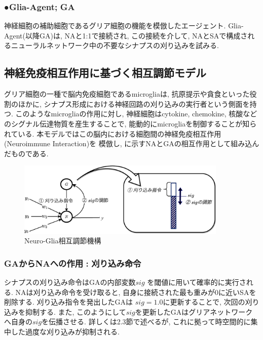 \documentclass[a4paper, 10.5pt,twocolumn,dvipdfmx]{jsarticle}
\begin{document}
  \subsubsection*{●Glia-Agent;\,\,GA}
  神経細胞の補助細胞であるグリア細胞の機能を模倣したエージェント. 
  Glia-Agent(以降GA)は, NAと1:1で接続され, この接続を介して, 
  NAとSAで構成されるニューラルネットワーク中の不要なシナプスの刈り込みを試みる.
  \vspace{2mm}
\subsection{神経免疫相互作用に基づく相互調節モデル}
グリア細胞の一種で脳内免疫細胞であるmicrogliaは, 抗原提示や貪食といった役割のほかに,  
シナプス形成における神経回路の刈り込みの実行者という側面を持つ. 
このようなmicrogliaの作用に対し, 
神経細胞はcytokine, chemokine, 核酸などのシグナル伝達物質を産生することで, 
能動的にmicrogliaを制御することが知られている. 
本モデルではこの脳内における細胞間の神経免疫相互作用(Neuroimmune Interaction)を
模倣し,
に示すNAとGAの相互作用として組み込んだものである.
\vspace{-1.5zh}
\begin{figure}[H]
  \centering
  \includegraphics[width=10cm]{NewDeal-crop.pdf}
  \caption{Neuro-Glia相互調節機構}
  \label{fig:NeuroGlia}
\end{figure}
\vspace{-2zh}
\vspace{2mm}
\subsubsection{GAからNAへの作用\,\,:\,\,刈り込み命令}
シナプスの刈り込み命令はGAの内部変数$sig$
を閾値に用いて確率的に実行される.
NAは刈り込み命令を受け取ると, 自身に接続された最も重みが0に近いSAを
削除する.
刈り込み指令を発出したGAは
$sig=1.0$に更新することで, 次回の刈り込みを抑制する.
また, このようにして$sig$を更新したGAはグリアネットワークへ自身の$sig$を伝播させる.
詳しくは2.3節で述べるが, これに拠って時空間的に集中した過度な刈り込みが抑制される.
\vspace{2mm}
\end{document}
